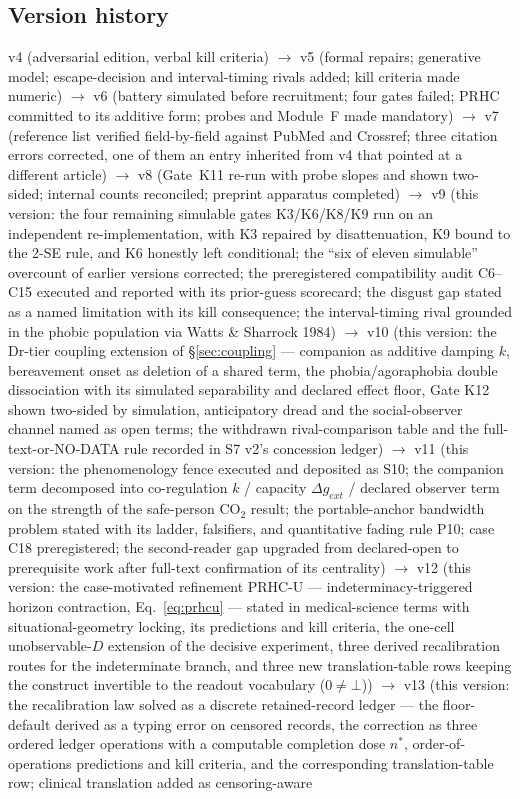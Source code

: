 \documentclass[9pt,twocolumn]{article}
\begin{document}
\subsection*{Version history}
v4 (adversarial edition, verbal kill criteria) $\rightarrow$ v5 (formal repairs; generative model; escape-decision and interval-timing rivals added; kill criteria made numeric) $\rightarrow$ v6 (battery simulated before recruitment; four gates failed; PRHC committed to its additive form; probes and Module~F made mandatory) $\rightarrow$ v7 (reference list verified field-by-field against PubMed and Crossref; three citation errors corrected, one of them an entry inherited from v4 that pointed at a different article) $\rightarrow$ v8 (Gate~K11 re-run with probe slopes and shown two-sided; internal counts reconciled; preprint apparatus completed) $\rightarrow$ v9 (this version: the four remaining simulable gates K3/K6/K8/K9 run on an independent re-implementation, with K3 repaired by disattenuation, K9 bound to the 2-SE rule, and K6 honestly left conditional; the ``six of eleven simulable'' overcount of earlier versions corrected; the preregistered compatibility audit C6--C15 executed and reported with its prior-guess scorecard; the disgust gap stated as a named limitation with its kill consequence; the interval-timing rival grounded in the phobic population via Watts \& Sharrock 1984) $\rightarrow$ v10 (this version: the Dr-tier coupling extension of \S\ref{sec:coupling} --- companion as additive damping $k$, bereavement onset as deletion of a shared term, the phobia/agoraphobia double dissociation with its simulated separability and declared effect floor, Gate K12 shown two-sided by simulation, anticipatory dread and the social-observer channel named as open terms; the withdrawn rival-comparison table and the full-text-or-NO-DATA rule recorded in S7 v2's concession ledger) $\rightarrow$ v11 (this version: the phenomenology fence executed and deposited as S10; the companion term decomposed into co-regulation $k$ / capacity $\Delta g_{ext}$ / declared observer term on the strength of the safe-person CO$_2$ result; the portable-anchor bandwidth problem stated with its ladder, falsifiers, and quantitative fading rule P10; case C18 preregistered; the second-reader gap upgraded from declared-open to prerequisite work after full-text confirmation of its centrality) $\rightarrow$ v12 (this version: the case-motivated refinement PRHC-U --- indeterminacy-triggered horizon contraction, Eq.~\ref{eq:prhcu} --- stated in medical-science terms with situational-geometry locking, its predictions and kill criteria, the one-cell unobservable-$D$ extension of the decisive experiment, three derived recalibration routes for the indeterminate branch, and three new translation-table rows keeping the construct invertible to the readout vocabulary ($0\neq\bot$)) $\rightarrow$ v13 (this version: the recalibration law solved as a discrete retained-record ledger --- the floor-default derived as a typing error on censored records, the correction as three ordered ledger operations with a computable completion dose $n^{*}$, order-of-operations predictions and kill criteria, and the corresponding translation-table row; clinical translation added as censoring-aware 
\end{document}
